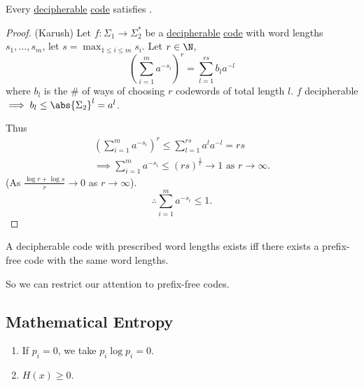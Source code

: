\documentclass{article}
\newcommand{\1}[1]{\mathbbm{1}_{#1}}
\begin{document}
\begin{nthm}[McMillan]\label{thm:mcmillan}
    Every \hyperlink{def:decipherable}{decipherable} \hyperlink{def:code}{code} satisfies .
\end{nthm}

\begin{proof}(Karush)
    Let $f: \Sigma_1 \to \Sigma_2^*$ be a \hyperlink{def:decipherable}{decipherable} \hyperlink{def:code}{code} with word lengths $s_1, \dotsc, s_m$, let $s = \max_{1 \leq i \leq m} s_i$.
    Let $r \in \N$,
    \begin{equation*}
        \left(\sum_{i=1}^m a^{-s_i}\right)^r = \sum_{l=1}^{rs} b_l a^{-l}
    \end{equation*}
    where $b_l$ is the \# of ways of choosing $r$ codewords of total length $l$. $f$ decipherable $\implies b_l \leq \abs{\Sigma_2}^l = a^l$.

    Thus \begin{gather*}\left(\sum_{i=1}^m a^{-s_i}\right)^r \leq \sum_{l=1}^{rs} a^l a^{-l} = rs \\
    \implies \sum_{i=1}^m a^{-s_i} \leq (rs)^{\frac{1}{r}} \to 1 \text{ as } r \to \infty.
    \end{gather*}
    (As $\frac{\log r + \log s}{r} \to 0$ as $r \to \infty$).
    \begin{equation*}
        \therefore \sum_{i=1}^m a^{-s_i} \leq 1.
    \end{equation*}
\end{proof}

\begin{cor}
    A decipherable code with prescribed word lengths exists iff there exists a prefix-free code with the same word lengths.
\end{cor}
So we can restrict our attention to prefix-free codes.

\subsection{Mathematical Entropy}

\begin{remark}
    \leavevmode
    \begin{enumerate}[label=(\roman*)]
        \item If $p_i = 0$, we take $p_i \log p_i=0$.
        \item $H(x) \geq 0$.
    \end{enumerate}
\end{remark}
\end{document}
